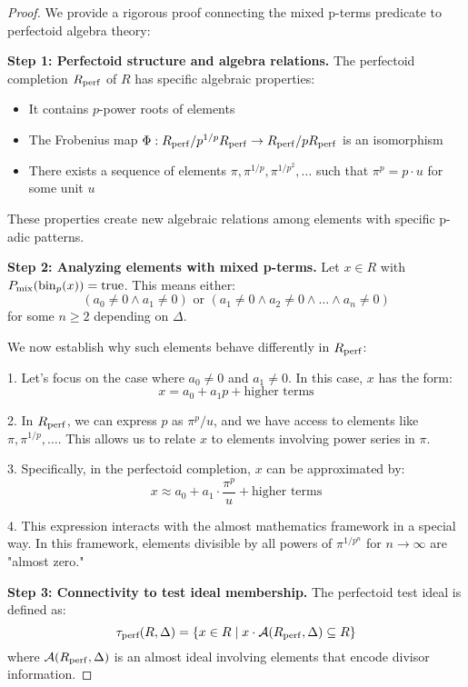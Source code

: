 \begin{proof}
We provide a rigorous proof connecting the mixed p-terms predicate to perfectoid algebra theory:

\textbf{Step 1: Perfectoid structure and algebra relations.}
The perfectoid completion $R_{\operatorname{perf}}$ of $R$ has specific algebraic properties:
\begin{itemize}
    \item It contains $p$-power roots of elements
    \item The Frobenius map $\Phi: R_{\operatorname{perf}}/p^{1/p}R_{\operatorname{perf}} \to R_{\operatorname{perf}}/pR_{\operatorname{perf}}$ is an isomorphism
    \item There exists a sequence of elements $\pi, \pi^{1/p}, \pi^{1/p^2}, \ldots$ such that $\pi^p = p \cdot u$ for some unit $u$
\end{itemize}

These properties create new algebraic relations among elements with specific p-adic patterns.

\textbf{Step 2: Analyzing elements with mixed p-terms.}
Let $x \in R$ with $P_{\text{mix}}(\operatorname{bin}_p(x)) = \text{true}$. This means either:
$$(a_0 \neq 0 \wedge a_1 \neq 0) \text{ or } (a_1 \neq 0 \wedge a_2 \neq 0 \wedge \ldots \wedge a_n \neq 0)$$
for some $n \geq 2$ depending on $\Delta$.

We now establish why such elements behave differently in $R_{\operatorname{perf}}$:

1. Let's focus on the case where $a_0 \neq 0$ and $a_1 \neq 0$. In this case, $x$ has the form:
   $$x = a_0 + a_1 p + \text{higher terms}$$

2. In $R_{\operatorname{perf}}$, we can express $p$ as $\pi^p/u$, and we have access to elements like $\pi, \pi^{1/p}, \ldots$. This allows us to relate $x$ to elements involving power series in $\pi$.

3. Specifically, in the perfectoid completion, $x$ can be approximated by:
   $$x \approx a_0 + a_1 \cdot \frac{\pi^p}{u} + \text{higher terms}$$

4. This expression interacts with the almost mathematics framework in a special way. In this framework, elements divisible by all powers of $\pi^{1/p^n}$ for $n \to \infty$ are "almost zero."

\textbf{Step 3: Connectivity to test ideal membership.}
The perfectoid test ideal is defined as:
$$\tau_{\text{perf}}(R,\Delta) = \{x \in R \mid x \cdot \mathcal{A}(R_{\operatorname{perf}}, \Delta) \subseteq R\}$$
where $\mathcal{A}(R_{\operatorname{perf}}, \Delta)$ is an almost ideal involving elements that encode divisor information.


\end{proof}
